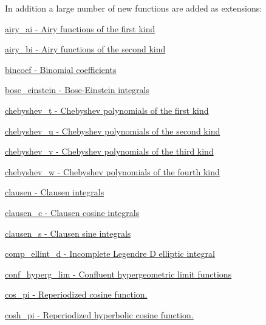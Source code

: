 In addition a large number of new functions are added as extensions\+:
\begin{DoxyItemize}
\item \hyperlink{group__gnu__math__spec__func_ga53243cdb83abeb008fa90d8a098768af}{airy\+\_\+ai -\/ Airy functions of the first kind}
\item \hyperlink{group__gnu__math__spec__func_ga812ca309bff1b0ae2bbe1183a0bc47d5}{airy\+\_\+bi -\/ Airy functions of the second kind}
\item \hyperlink{group__gnu__math__spec__func_ga2934ccfb8bbd5877efd369a3ecd9ac4d}{bincoef -\/ Binomial coefficients}
\item \hyperlink{group__gnu__math__spec__func_gacf63ebbc67ea21d569cf510ed0da95fd}{bose\+\_\+einstein -\/ Bose-\/\+Einstein integrals}
\item \hyperlink{group__gnu__math__spec__func_gae35c0bc63248e3bcdb9b490477975eb4}{chebyshev\+\_\+t -\/ Chebyshev polynomials of the first kind}
\item \hyperlink{group__gnu__math__spec__func_gaea7ea830fe6be79ca84fba1bb94691a4}{chebyshev\+\_\+u -\/ Chebyshev polynomials of the second kind}
\item \hyperlink{group__gnu__math__spec__func_ga674e3d97204a74620eb0d408873aefb9}{chebyshev\+\_\+v -\/ Chebyshev polynomials of the third kind}
\item \hyperlink{group__gnu__math__spec__func_ga55ebf3cda76302bc6e0f173fc1c1425e}{chebyshev\+\_\+w -\/ Chebyshev polynomials of the fourth kind}
\item \hyperlink{group__gnu__math__spec__func_ga7959ce3dea7f8d98b1dfee5715303f1c}{clausen -\/ Clausen integrals}
\item \hyperlink{group__gnu__math__spec__func_gabbdae75b253a0b19e8ae3d42c14f6be3}{clausen\+\_\+c -\/ Clausen cosine integrals}
\item \hyperlink{group__gnu__math__spec__func_ga3ed0e444799410cda76ccbc62181ce0c}{clausen\+\_\+s -\/ Clausen sine integrals}
\item \hyperlink{group__gnu__math__spec__func_ga2c6b6c5a44ea00f0aed05c02f1072c31}{comp\+\_\+ellint\+\_\+d -\/ Incomplete Legendre D elliptic integral}
\item \hyperlink{group__gnu__math__spec__func_gab923b5a9e67469a5145d7bfcb20b3396}{conf\+\_\+hyperg\+\_\+lim -\/ Confluent hypergeometric limit functions}
\item \hyperlink{group__gnu__math__spec__func_ga5ebda736a00921a739ed657cab0643ec}{cos\+\_\+pi -\/ Reperiodized cosine function.}
\item \hyperlink{group__gnu__math__spec__func_ga4400f758578400b7a10f8202f854c8b4}{cosh\+\_\+pi -\/ Reperiodized hyperbolic cosine function.}

\end{DoxyItemize}
